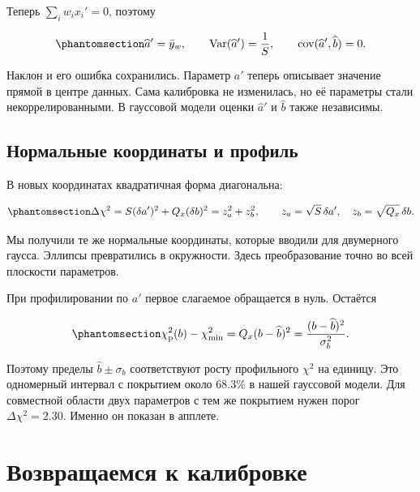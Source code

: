 \documentclass[
  russian,
  11pt,
  a4paper,
  open=any]{scrbook}
\begin{document}
Теперь \(\sum_iw_ix_i'=0\), поэтому

\begin{equation}\protect\phantomsection\label{eq-ch11-centered-errors}{
\widehat a'=\bar y_w,
\qquad
\operatorname{Var}(\widehat a')=\frac1S,
\qquad
\operatorname{cov}(\widehat a',\widehat b)=0.
}\end{equation}

Наклон и его ошибка сохранились. Параметр \(a'\) теперь описывает
значение прямой в центре данных. Сама калибровка не изменилась, но её
параметры стали некоррелированными. В гауссовой модели оценки
\(\widehat a'\) и \(\widehat b\) также независимы.

\subsection{Нормальные координаты и
профиль}\label{ux43dux43eux440ux43cux430ux43bux44cux43dux44bux435-ux43aux43eux43eux440ux434ux438ux43dux430ux442ux44b-ux438-ux43fux440ux43eux444ux438ux43bux44c}

В новых координатах квадратичная форма диагональна:

\begin{equation}\protect\phantomsection\label{eq-ch11-normal-coordinates}{
\Delta\chi^2=S(\delta a')^2+Q_x(\delta b)^2
=z_a^2+z_b^2,
\qquad
z_a=\sqrt S\,\delta a',\quad z_b=\sqrt{Q_x}\,\delta b.
}\end{equation}

Мы получили те же нормальные координаты, которые вводили для двумерного
гаусса. Эллипсы превратились в окружности. Здесь преобразование точно во
всей плоскости параметров.

При профилировании по \(a'\) первое слагаемое обращается в нуль.
Остаётся

\begin{equation}\protect\phantomsection\label{eq-ch11-slope-profile}{
\chi^2_{\mathrm p}(b)-\chi^2_{\min}
=Q_x(b-\widehat b)^2
=\frac{(b-\widehat b)^2}{\sigma_b^2}.
}\end{equation}

Поэтому пределы \(\widehat b\pm\sigma_b\) соответствуют росту
профильного \(\chi^2\) на единицу. Это одномерный интервал с покрытием
около \(68.3\%\) в нашей гауссовой модели. Для совместной области двух
параметров с тем же покрытием нужен порог \(\Delta\chi^2=2.30\). Именно
он показан в апплете.

\section{Возвращаемся к
калибровке}\label{ux432ux43eux437ux432ux440ux430ux449ux430ux435ux43cux441ux44f-ux43a-ux43aux430ux43bux438ux431ux440ux43eux432ux43aux435}
\end{document}
